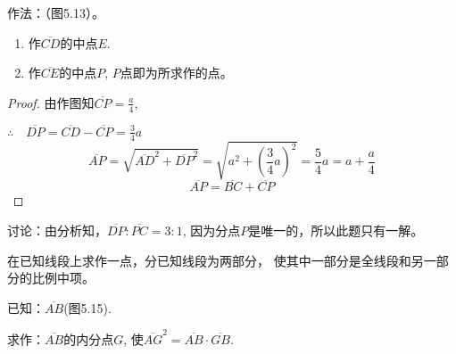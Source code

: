 作法：（图5.13）。

\begin{enumerate}
    \item 作$\overline{CD}$的中点$E$.
    \item 作$\overline{CE}$的中点$P$, $P$点即为所求作的点。
\end{enumerate}

\begin{proof}
    由作图知$\overline{CP}=\frac{a}{4}$,

$\therefore\quad \overline{DP}=\overline{CD}-\overline{CP}=\frac{3}{4}a$
\[\overline{AP}=\sqrt{\overline{AD}^2+\overline{DP}^2}=\sqrt{a^2+\left(\frac{3}{4}a\right)^2}=\frac{5}{4}a=a+\frac{a}{4}\]
\[\overline{AP}=\overline{BC}+\overline{CP}\]
\end{proof}


讨论：由分析知，$\overline{DP}:\overline{PC}=3:1$, 因为分点$P$是唯一的，所以此题只有一解。


\begin{example}
    在已知线段上求作一点，分已知线段为两部分，
    使其中一部分是全线段和另一部分的比例中项。

    已知：$\overline{AB}$(图5.15).

    求作：$\overline{AB}$的内分点$G$, 使$\overline{AG}^2=\overline{AB}\cdot \overline{GB}$.
\end{example}

\begin{figure}[htp]\centering
    \begin{minipage}[t]{0.48\textwidth}
    \centering
{}
    \caption{}
    \end{minipage}
    \begin{minipage}[t]{0.48\textwidth}
    \centering
    \caption{}
    \end{minipage}
    \end{figure}



